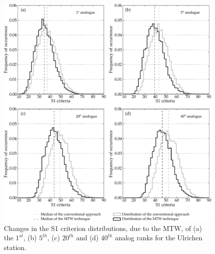 \documentclass[hess, manuscript]{copernicus}
\begin{document}
\begin{figure}[htb]
	\begin{center}
		\includegraphics[width=15cm]{figures/changes_S1_analogues.pdf}
	\end{center}
	\caption{Changes in the S1 criterion distributions, due to the MTW, of (a) the $1^{st}$, (b) $5^{th}$, (c) $20^{th}$ and (d) $40^{th}$ analog ranks for the Ulrichen station.}
	\label{fig:changes_S1_analogs}
\end{figure}
\end{document}
